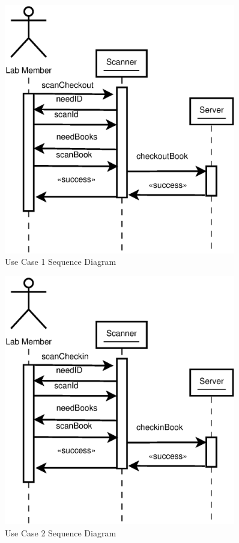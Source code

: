 \documentclass[a4paper, 10pt, oneside, draft]{article}
\begin{document}
\begin{figure}[p]
    \centering
    \includegraphics[width=0.9\textwidth]{Use_Case_1}
    \caption{Use Case 1 Sequence Diagram}
    \label{fig:usecase1_image}
\end{figure}

\begin{figure}[p]
    \centering
    \includegraphics[width=0.9\textwidth]{Use_Case_2}
    \caption{Use Case 2 Sequence Diagram}
    \label{fig:usecase2_image}
\end{figure}
\end{document}
